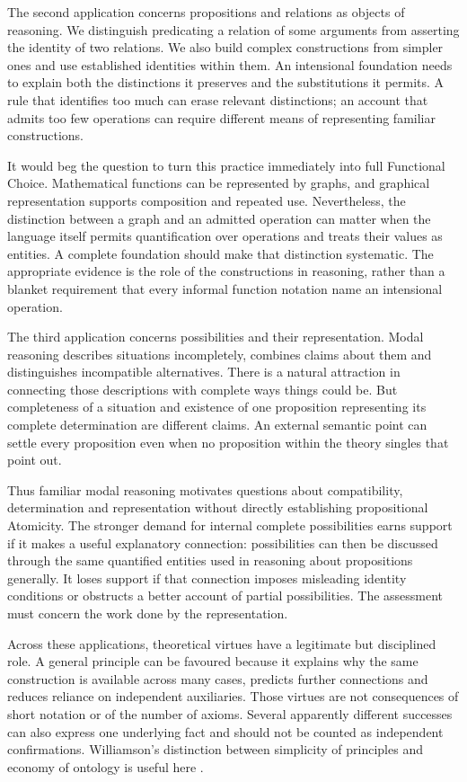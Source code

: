 \documentclass[11pt]{article}
\begin{document}
The second application concerns propositions and relations as objects of reasoning. We distinguish predicating a relation of some arguments from asserting the identity of two relations. We also build complex constructions from simpler ones and use established identities within them. An intensional foundation needs to explain both the distinctions it preserves and the substitutions it permits. A rule that identifies too much can erase relevant distinctions; an account that admits too few operations can require different means of representing familiar constructions.

It would beg the question to turn this practice immediately into full Functional Choice. Mathematical functions can be represented by graphs, and graphical representation supports composition and repeated use. Nevertheless, the distinction between a graph and an admitted operation can matter when the language itself permits quantification over operations and treats their values as entities. A complete foundation should make that distinction systematic. The appropriate evidence is the role of the constructions in reasoning, rather than a blanket requirement that every informal function notation name an intensional operation.

The third application concerns possibilities and their representation. Modal reasoning describes situations incompletely, combines claims about them and distinguishes incompatible alternatives. There is a natural attraction in connecting those descriptions with complete ways things could be. But completeness of a situation and existence of one proposition representing its complete determination are different claims. An external semantic point can settle every proposition even when no proposition within the theory singles that point out.

Thus familiar modal reasoning motivates questions about compatibility, determination and representation without directly establishing propositional Atomicity. The stronger demand for internal complete possibilities earns support if it makes a useful explanatory connection: possibilities can then be discussed through the same quantified entities used in reasoning about propositions generally. It loses support if that connection imposes misleading identity conditions or obstructs a better account of partial possibilities. The assessment must concern the work done by the representation.

Across these applications, theoretical virtues have a legitimate but disciplined role. A general principle can be favoured because it explains why the same construction is available across many cases, predicts further connections and reduces reliance on independent auxiliaries. Those virtues are not consequences of short notation or of the number of axioms. Several apparently different successes can also express one underlying fact and should not be counted as independent confirmations. Williamson's distinction between simplicity of principles and economy of ontology is useful here \citep[\S1.2, pp.~8--9]{williamson2013}.
\end{document}
